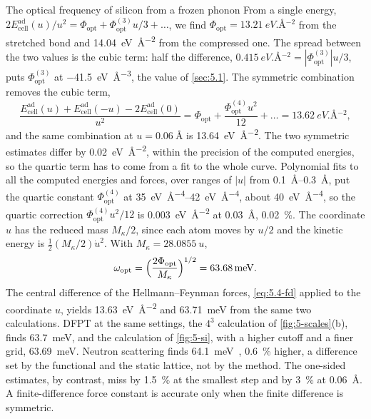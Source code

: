 \begin{workedexample}{The optical frequency of silicon from a frozen phonon}
From a single energy, $2E^{\mathrm{ad}}_{\mathrm{cell}}(u)/u^2 = \Phi_{\mathrm{opt}} + \Phi^{(3)}_{\mathrm{opt}}u/3 + \dots$, we find $\Phi_{\mathrm{opt}} = \SI{13.21}{eV.\angstrom^{-2}}$ from the stretched bond and \SI{14.04}{eV.\angstrom^{-2}} from the compressed one. The spread between the two values is the cubic term: half the difference, $\SI{0.415}{eV.\angstrom^{-2}} = |\Phi^{(3)}_{\mathrm{opt}}|u/3$, puts $\Phi^{(3)}_{\mathrm{opt}}$ at \SI{-41.5}{eV.\angstrom^{-3}}, the value of \cref{sec:5.1}. The symmetric combination removes the cubic term,
\begin{equation*}
  \frac{E^{\mathrm{ad}}_{\mathrm{cell}}(u) + E^{\mathrm{ad}}_{\mathrm{cell}}(-u) - 2E^{\mathrm{ad}}_{\mathrm{cell}}(0)}{u^2} = \Phi_{\mathrm{opt}} + \frac{\Phi^{(4)}_{\mathrm{opt}}u^2}{12} + \dots = \SI{13.62}{eV.\angstrom^{-2}} ,
\end{equation*}
and the same combination at $u = \SI{0.06}{\angstrom}$ is \SI{13.64}{eV.\angstrom^{-2}}. The two symmetric estimates differ by \SI{0.02}{eV.\angstrom^{-2}}, within the precision of the computed energies, so the quartic term has to come from a fit to the whole curve. Polynomial fits to all the computed energies and forces, over ranges of $|u|$ from \SIrange{0.1}{0.3}{\angstrom}, put the quartic constant $\Phi^{(4)}_{\mathrm{opt}}$ at \SIrange{35}{42}{eV.\angstrom^{-4}}, about \SI{40}{eV.\angstrom^{-4}}, so the quartic correction $\Phi^{(4)}_{\mathrm{opt}}u^2/12$ is \SI{0.003}{eV.\angstrom^{-2}} at \SI{0.03}{\angstrom}, \SI{0.02}{\percent}. The coordinate $u$ has the reduced mass $M_\kappa/2$, since each atom moves by $u/2$ and the kinetic energy is $\tfrac12(M_\kappa/2)\dot u^2$. With $M_\kappa = \SI{28.0855}{u}$,
\begin{equation*}
  \omega_{\mathrm{opt}} = \Bigl(\frac{2\Phi_{\mathrm{opt}}}{M_\kappa}\Bigr)^{1/2} = \SI{63.68}{meV} .
\end{equation*}
The central difference of the Hellmann--Feynman forces, \cref{eq:5.4-fd} applied to the coordinate $u$, yields \SI{13.63}{eV.\angstrom^{-2}} and \SI{63.71}{meV} from the same two calculations. DFPT at the same settings, the $4^3$ calculation of \cref{fig:5-scales}(b), finds \SI{63.7}{meV}, and the calculation of \cref{fig:5-si}, with a higher cutoff and a finer grid, \SI{63.69}{meV}. Neutron scattering finds \SI{64.1}{meV}~\cite{nilsson1972study}, \SI{0.6}{\percent} higher, a difference set by the functional and the static lattice, not by the method. The one-sided estimates, by contrast, miss by \SI{1.5}{\percent} at the smallest step and by \SI{3}{\percent} at \SI{0.06}{\angstrom}. A finite-difference force constant is accurate only when the finite difference is symmetric.
\end{workedexample}


